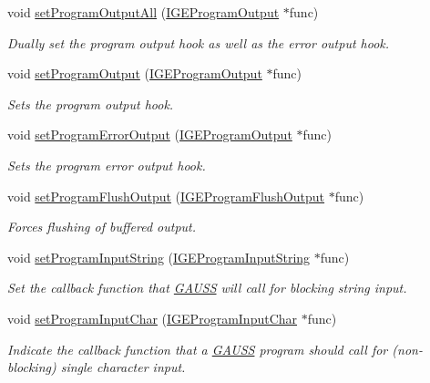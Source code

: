 \begin{DoxyCompactItemize}
\item 
void \hyperlink{class_g_a_u_s_s_a0b8379c48d677e05aeab433dba66fbb6}{set\-Program\-Output\-All} (\hyperlink{class_i_g_e_program_output}{I\-G\-E\-Program\-Output} $\ast$func)
\begin{DoxyCompactList}\small\item\em Dually set the program output hook as well as the error output hook. \end{DoxyCompactList}\item 
void \hyperlink{class_g_a_u_s_s_a7f0dc6b5b307aa06c347f9c6a9fdacab}{set\-Program\-Output} (\hyperlink{class_i_g_e_program_output}{I\-G\-E\-Program\-Output} $\ast$func)
\begin{DoxyCompactList}\small\item\em Sets the program output hook. \end{DoxyCompactList}\item 
void \hyperlink{class_g_a_u_s_s_abd75266b2c4075da75163fe95b013ef3}{set\-Program\-Error\-Output} (\hyperlink{class_i_g_e_program_output}{I\-G\-E\-Program\-Output} $\ast$func)
\begin{DoxyCompactList}\small\item\em Sets the program error output hook. \end{DoxyCompactList}\item 
void \hyperlink{class_g_a_u_s_s_a4b7ecb768f49b98110729db7e5728296}{set\-Program\-Flush\-Output} (\hyperlink{class_i_g_e_program_flush_output}{I\-G\-E\-Program\-Flush\-Output} $\ast$func)
\begin{DoxyCompactList}\small\item\em Forces flushing of buffered output. \end{DoxyCompactList}\item 
void \hyperlink{class_g_a_u_s_s_ae82b5bfdf26971433c46936a812506c3}{set\-Program\-Input\-String} (\hyperlink{class_i_g_e_program_input_string}{I\-G\-E\-Program\-Input\-String} $\ast$func)
\begin{DoxyCompactList}\small\item\em Set the callback function that \hyperlink{class_g_a_u_s_s}{G\-A\-U\-S\-S} will call for blocking string input. \end{DoxyCompactList}\item 
void \hyperlink{class_g_a_u_s_s_a71a60afb143ae00b18d6fe3fd99f316d}{set\-Program\-Input\-Char} (\hyperlink{class_i_g_e_program_input_char}{I\-G\-E\-Program\-Input\-Char} $\ast$func)
\begin{DoxyCompactList}\small\item\em Indicate the callback function that a \hyperlink{class_g_a_u_s_s}{G\-A\-U\-S\-S} program should call for (non-\/blocking) single character input. \end{DoxyCompactList}\item 

\end{DoxyCompactItemize}
